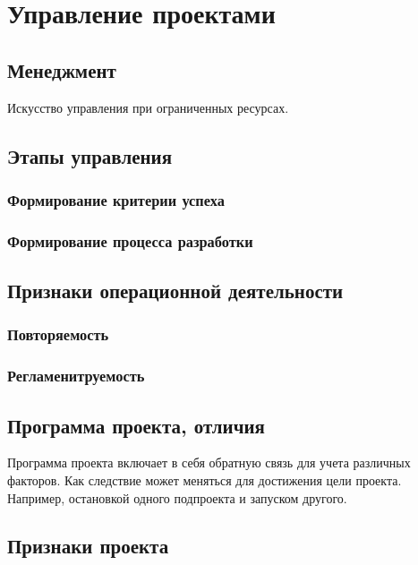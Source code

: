 \chapter{Управление проектами}

\section{Менеджмент}
Искусство управления при ограниченных ресурсах.

\section{Этапы управления}

\subsection{Формирование критерии успеха}
\subsection{Формирование процесса разработки}

\section{Признаки операционной деятельности}

\subsection{Повторяемость}
\subsection{Регламенитруемость}

\section{Программа проекта, отличия}
Программа проекта включает в себя обратную связь для учета различных факторов. Как следствие может меняться для достижения цели проекта. Например, остановкой одного подпроекта и запуском другого.

\section{Признаки проекта}

